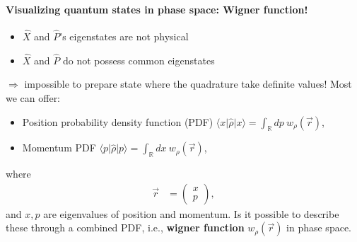 \documentclass[../../note.tex]{subfiles}
\begin{document}
\paragraph{Visualizing quantum states in phase space: Wigner function!}
\begin{itemize}
    \item $\hat{X}$ and $\hat{P}$'s eigenstates are not physical
    \item $\hat{X}$ and $\hat{P}$ do not possess common eigenstates
\end{itemize}
$\Longrightarrow$ impossible to prepare state where the quadrature take definite values! Most we can offer:
\begin{itemize}
    \item Position probability density function (PDF) $\langle x \vert \hat{\rho} \vert x \rangle = \int_{\mathbb{R}}{d p}~w_{\rho}(\overrightarrow{r})$,
    \item Momentum PDF $\langle p \vert \hat{\rho} \vert p \rangle = \int_{\mathbb{R}}{d x}~w_{\rho}(\overrightarrow{r})$,
\end{itemize}
where
\begin{align}
    \overrightarrow{r}
    &= \left(
        \begin{matrix}
            x \\
            p
        \end{matrix}
       \right),
\end{align}
and $x, p$ are eigenvalues of position and momentum. Is it possible to describe these through a combined PDF, i.e., \textbf{wigner function} $w_{\rho}(\overrightarrow{r})$ in phase space.
\end{document}
